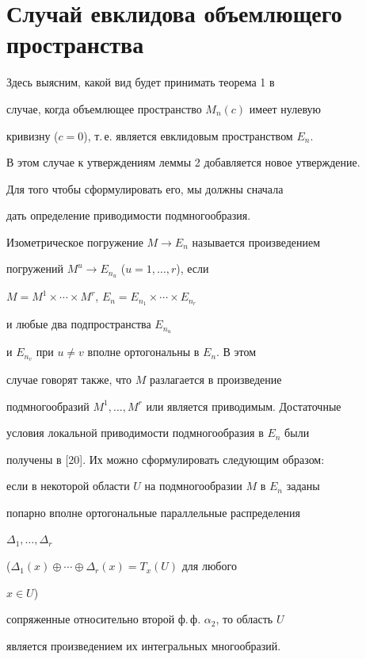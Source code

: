 \section{Случай евклидова объемлющего пространства}





Здесь выясним, какой вид будет принимать теорема 1 в


случае, когда объемлющее пространство $M_n(c)$ имеет нулевую


кривизну ($c=0$), т.\,е. является евклидовым пространством $E_n$.


В этом случае к утверждениям леммы 2 добавляется новое утверждение.


Для того чтобы сформулировать его, мы должны сначала


дать определение приводимости подмногообразия.





Изометрическое погружение $M\to E_n$ называется произведением


погружений $M^u\to E_{n_u}$ ($u=1,\dotsc,r$), если


$M=M^1\times\dotsb\times M^r$, $E_n=E_{n_1}\times\dotsb\times E_{n_r}$


и любые два подпространства $E_{n_u}$


и $E_{n_v}$ при $u\ne v$ вполне ортогональны в $E_n$. В этом


случае говорят также, что $M$ разлагается в произведение


подмногообразий $M^1,\dotsc,M^r$ или является приводимым. Достаточные


условия локальной приводимости подмногообразия в $E_n$ были


получены в [20]. Их можно сформулировать следующим образом:


если в некоторой области $U$ на подмногообразии $M$ в $E_n$ заданы


попарно вполне ортогональные параллельные распределения


$\Delta_1,\dotsc,\Delta_r$


($\Delta_1(x)\oplus\dotsb\oplus\Delta_r(x)=T_x(U)$ для любого


$x\in U$)


сопряженные относительно второй ф.\,ф. $\alpha_2$, то область $U$


является произведением их интегральных многообразий.





